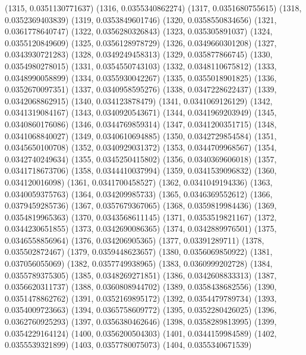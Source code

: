 {					(1315, 0.0351130771637)
					(1316, 0.0355340862274)
					(1317, 0.0351680755615)
					(1318, 0.0352369403839)
					(1319, 0.0353849601746)
					(1320, 0.0358550834656)
					(1321, 0.0361778640747)
					(1322, 0.0356280326843)
					(1323, 0.035305891037)
					(1324, 0.0355120849609)
					(1325, 0.0356128978729)
					(1326, 0.0349660301208)
					(1327, 0.0343930721283)
					(1328, 0.0349249458313)
					(1329, 0.035877866745)
					(1330, 0.0354980278015)
					(1331, 0.0354550743103)
					(1332, 0.0348110675812)
					(1333, 0.0348990058899)
					(1334, 0.0355930042267)
					(1335, 0.0355018901825)
					(1336, 0.0352670097351)
					(1337, 0.0340958595276)
					(1338, 0.0347228622437)
					(1339, 0.0342068862915)
					(1340, 0.034123878479)
					(1341, 0.0341069126129)
					(1342, 0.0341319084167)
					(1343, 0.0340920543671)
					(1344, 0.0341969203949)
					(1345, 0.0340860176086)
					(1346, 0.0344769859314)
					(1347, 0.0341200351715)
					(1348, 0.0341068840027)
					(1349, 0.0340610694885)
					(1350, 0.0342729854584)
					(1351, 0.0345650100708)
					(1352, 0.0340929031372)
					(1353, 0.0344709968567)
					(1354, 0.0342740249634)
					(1355, 0.0345250415802)
					(1356, 0.0340369606018)
					(1357, 0.0341718673706)
					(1358, 0.0344410037994)
					(1359, 0.0341539096832)
					(1360, 0.034120016098)
					(1361, 0.0341700458527)
					(1362, 0.0341049194336)
					(1363, 0.0340059375763)
					(1364, 0.034209985733)
					(1365, 0.0346369552612)
					(1366, 0.0379459285736)
					(1367, 0.0357679367065)
					(1368, 0.0359819984436)
					(1369, 0.0354819965363)
					(1370, 0.0343568611145)
					(1371, 0.0353519821167)
					(1372, 0.0344230651855)
					(1373, 0.0342690086365)
					(1374, 0.0342889976501)
					(1375, 0.0346558856964)
					(1376, 0.034206905365)
					(1377, 0.03391289711)
					(1378, 0.035502872467)
					(1379, 0.0359448623657)
					(1380, 0.0356069850922)
					(1381, 0.037056055069)
					(1382, 0.0357749938965)
					(1383, 0.0360999202728)
					(1384, 0.0355789375305)
					(1385, 0.0348269271851)
					(1386, 0.0342608833313)
					(1387, 0.0356620311737)
					(1388, 0.0360808944702)
					(1389, 0.0358438682556)
					(1390, 0.0351478862762)
					(1391, 0.0352169895172)
					(1392, 0.0354479789734)
					(1393, 0.0354009723663)
					(1394, 0.0365758609772)
					(1395, 0.0352280426025)
					(1396, 0.0362760925293)
					(1397, 0.0356380462646)
					(1398, 0.0358289813995)
					(1399, 0.0354229164124)
					(1400, 0.0356200504303)
					(1401, 0.0344159984589)
					(1402, 0.0355539321899)
					(1403, 0.0357780075073)
					(1404, 0.0355340671539)
}
